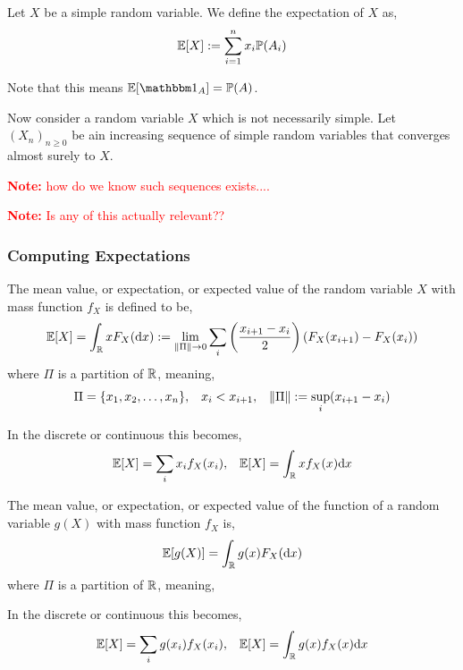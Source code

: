 \documentclass[12pt]{article}
\newcommand{\note}[1]{\textcolor{red}{\textbf{Note:} #1}}
\begin{document}
\begin{definition}
Let \( X \) be a simple random variable. We define the expectation of \( X \) as,
\begin{align*}
    \mathbb{E}[ X ] := \sum_{i=1}^{n} x_i \mathbb{P}(A_i)
\end{align*}
\end{definition}

Note that this means \( \EE[ \bOne_A ]= \PP(A) \).


Now consider a random variable \( X \) which is not necessarily simple. Let \( (X_n)_{n\geq 0} \) be ain increasing sequence of simple random variables that converges almost surely to \( X \).

\note{how do we know such sequences exists....}

\note{Is any of this actually relevant??}

\subsubsection{Computing Expectations}

\begin{definition}[Expectation]
The mean value, or expectation, or expected value of the random variable \( X \) with mass function \( f_X \) is defined to be,
\begin{align*}
    \mathbb{E}[ X ] = \int_{\mathbb{R}} xF_X(\mathrm{d} x):= \lim_{\left\lVert\Pi\right\rVert\to 0} \sum_i \left( \dfrac{x_{i+1}-x_i}{2} \right) \left( F_X(x_{i+1}) - F_X(x_i) \right)
\end{align*}
where \( \Pi \) is a partition of \( \mathbb{R} \), meaning,
\begin{align*}
    \Pi = \{x_1, x_2, \ldots, x_n\}, && x_i < x_{i+1}, && \left\lVert\Pi\right\rVert:= \sup_i(x_{i+1}-x_i)
\end{align*}

In the discrete or continuous this becomes,
\begin{align*}
    \mathbb{E}[ X ] = \sum_i x_i f_X(x_i), &&
    \mathbb{E}[ X ] = \int_{\mathbb{R}} x f_X(x) \mathrm{d} x
\end{align*}
\end{definition}

\begin{definition}
The mean value, or expectation, or expected value of the function of a random variable \( g(X) \) with mass function \( f_X \) is,
\begin{align*}
    \mathbb{E}[ g(X)] = \int_{\mathbb{R}} g(x) F_X(\mathrm{d} x)
\end{align*}
where \( \Pi \) is a partition of \( \mathbb{R} \), meaning,

In the discrete or continuous this becomes,
\begin{align*}
    \mathbb{E}[ X ] = \sum_i g(x_i) f_X(x_i), &&
    \mathbb{E}[ X ] = \int_{\mathbb{R}} g(x) f_X(x) \mathrm{d} x
\end{align*}
\end{definition}
\end{document}
